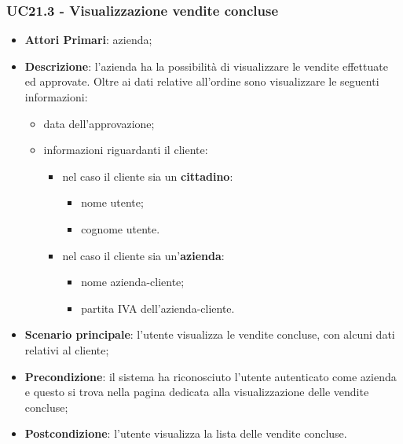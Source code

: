 \subsubsection{UC21.3 - Visualizzazione vendite concluse}
\begin{itemize}
	\item \textbf{Attori Primari}: azienda;
	\item \textbf{Descrizione}: l'azienda ha la possibilità di visualizzare le vendite effettuate ed approvate. Oltre ai dati relative all'ordine sono visualizzare le seguenti informazioni:
		\begin{itemize}
		\item data dell'approvazione;
		\item informazioni riguardanti il cliente:
		\begin{itemize}
			\item nel caso il cliente sia un \textbf{cittadino}:
			\begin{itemize}
				
				\item nome utente;
				\item cognome utente.
			\end{itemize}
			\item nel caso il cliente sia un'\textbf{azienda}:
			\begin{itemize}
				
				\item nome azienda-cliente;
				\item partita IVA dell'azienda-cliente.
			\end{itemize}
		\end{itemize}
		
	\end{itemize}
	\item \textbf{Scenario principale}:  l'utente visualizza le vendite concluse, con alcuni dati relativi al cliente; 
	\item \textbf{Precondizione}: il sistema ha riconosciuto l'utente autenticato come azienda e questo si trova nella pagina dedicata alla visualizzazione delle vendite concluse;
	\item \textbf{Postcondizione}: l'utente visualizza la lista delle vendite concluse.
\end{itemize}


